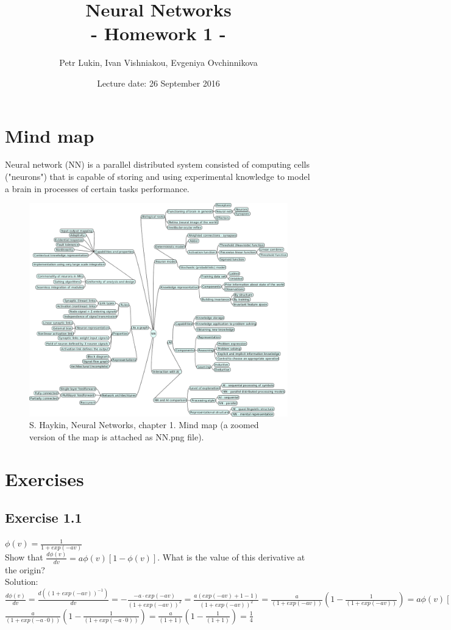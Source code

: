 \documentclass[a4paper, 12pt]{article}
\title{Neural Networks  \\
				- Homework 1 -}
\author{Petr Lukin, Ivan Vishniakou, Evgeniya Ovchinnikova}
\date{Lecture date: 26 September 2016}
\begin{document}
\maketitle

\section{Mind map}
Neural network (NN) is a parallel distributed system consisted of computing cells ("neurons") that is capable of storing and using experimental knowledge to model a brain in processes of certain tasks performance.

\begin{figure}[h]
  \centering
  \caption{S. Haykin, Neural Networks, chapter 1. Mind map (a zoomed version of the map is attached as NN.png file).\label{fig:mindMap}}
  \includegraphics[width=1.0\textwidth]{NN}
\end{figure}

\section{Exercises}

\subsection{Exercise 1.1}

$\phi(v) = \frac{1}{1 + exp(-av)}$\\

Show that $\frac{d\phi(v)}{dv} = a\phi(v)[1 - \phi(v)]$. What is the value of this derivative at the origin?\\

Solution:\\

$\frac{d\phi(v)}{dv} = \frac{d((1 + exp(-av))^{-1})}{dv} = -\frac{-a\cdot exp(-av)}{(1 + exp(-av))^2} = \frac{a(exp(-av) + 1 -1)}{(1 + exp(-av))^2} = \frac{a}{(1 + exp(-av))} (1 - \frac{1}{(1 + exp(-av))}) = a\phi(v)[1 - \phi(v)]$\\

$\frac{a}{(1 + exp(-a\cdot 0))} (1 - \frac{1}{(1 + exp(-a\cdot 0))}) = \frac{a}{(1 + 1)} (1 - \frac{1}{(1 + 1)}) = \frac{1}{4}$
\end{document}
